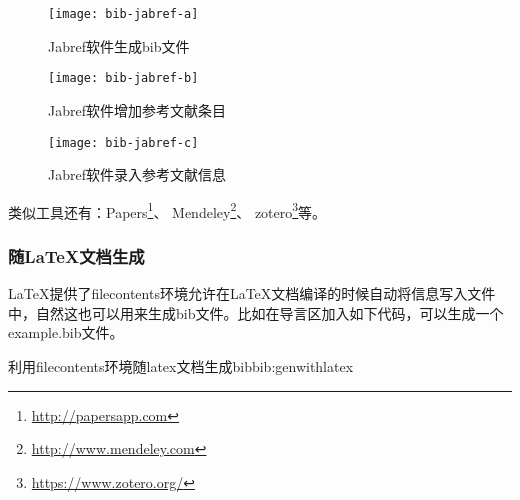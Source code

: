 \documentclass[twoside]{article} %
\begin{document}
\begin{figure}[!htb]
  \centering
  \texttt{[image: bib-jabref-a]}
  \caption{Jabref软件生成bib文件}\label{bib:jabref-a}
\end{figure}

\begin{figure}[!htb]
  \centering
  \texttt{[image: bib-jabref-b]}
  \caption{Jabref软件增加参考文献条目}\label{bib:jabref-b}
\end{figure}

\begin{figure}[!htb]
  \centering
  \texttt{[image: bib-jabref-c]}
  \caption{Jabref软件录入参考文献信息}\label{bib:jabref-c}
\end{figure}

类似工具还有：Papers\footnote{\url{http://papersapp.com}}、
Mendeley\footnote{\url{http://www.mendeley.com}}、
zotero\footnote{\url{https://www.zotero.org/}}等。



\subsubsection{随\LaTeX 文档生成}
\LaTeX 提供了filecontents环境允许在\LaTeX 文档编译的时候自动将信息写入文件中，自然这也可以用来生成bib文件。比如在导言区加入如下代码，可以生成一个example.bib文件。

\begin{codetex}{利用filecontents环境随latex文档生成bib}{bib:genwithlatex}
\usepackage{filecontents}
\end{codetex}
\end{document}
